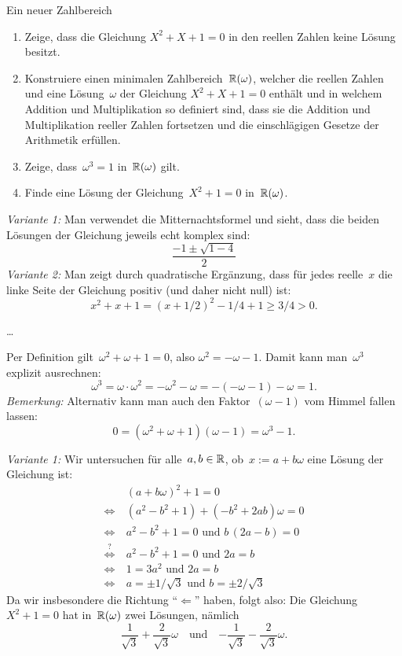 \documentclass{algblatt}
\begin{document}
\ifloesungen\newpage\fi
\begin{aufgabe}{Ein neuer Zahlbereich}
\begin{enumerate}
\item
Zeige, dass die Gleichung $X^2 + X + 1 = 0$ in den reellen Zahlen
keine Lösung besitzt.
\item
Konstruiere einen minimalen Zahlbereich~$\mathbb{R}(\omega)$, welcher die
reellen Zahlen und eine Lösung~$\omega$ der Gleichung $X^2 + X + 1 = 0$
enthält und in welchem Addition und Multiplikation so definiert sind, dass sie
die Addition und Multiplikation reeller Zahlen fortsetzen und die
einschlägigen Gesetze der Arithmetik erfüllen.
\item Zeige, dass~$\omega^3 = 1$ in~$\mathbb{R}(\omega)$ gilt.
\item Finde eine Lösung der Gleichung~$X^2 + 1 = 0$ in~$\mathbb{R}(\omega)$.
\end{enumerate}
\begin{loesungE}
\item \emph{Variante 1:} Man verwendet die Mitternachtsformel und sieht, dass
die beiden Lösungen der Gleichung jeweils echt komplex sind:
\[ \frac{-1 \pm \sqrt{1 - 4}}{2} \]
\emph{Variante 2:} Man zeigt durch quadratische Ergänzung, dass für jedes
reelle~$x$ die linke Seite der Gleichung positiv (und daher nicht null) ist:
\[ x^2 + x + 1 = (x + 1/2)^2 - 1/4 + 1 \geq 3/4 > 0. \]
\item \ldots
\item Per Definition gilt~$\omega^2 + \omega + 1 = 0$, also $\omega^2 = -\omega
- 1$. Damit kann man~$\omega^3$ explizit ausrechnen:
\[ \omega^3 = \omega \cdot \omega^2 = -\omega^2 - \omega = -(-\omega - 1) -
\omega = 1. \]
\emph{Bemerkung:} Alternativ kann man auch den Faktor~$(\omega-1)$ vom Himmel
fallen lassen:
\[ 0 = (\omega^2 + \omega + 1) (\omega - 1) = \omega^3 - 1. \]

\item \emph{Variante 1:} Wir untersuchen für alle~$a,b \in \mathbb{R}$, ob~$x := a + b
\omega$ eine Lösung der Gleichung ist:
\begin{align*}
  & (a + b\omega)^2 + 1 = 0 \\
  \Longleftrightarrow\ &
  (a^2 - b^2 + 1) + (-b^2 + 2ab) \omega = 0 \\
  \Longleftrightarrow\ &
  a^2 - b^2 + 1 = 0 \text{ und } b \, (2a-b) = 0 \\
  \stackrel{?}{\Longleftrightarrow}\ &
  a^2 - b^2 + 1 = 0 \text{ und } 2a = b \\
  \Longleftrightarrow\ &
  1 = 3 a^2 \text{ und } 2a = b \\
  \Longleftrightarrow\ &
  a = \pm 1 / \sqrt{3} \text{ und } b = \pm 2 / \sqrt{3}
\end{align*}
Da wir insbesondere die Richtung "`$\Leftarrow$"' haben, folgt also: Die
Gleichung~$X^2 + 1 = 0$ hat in~$\mathbb{R}(\omega)$ zwei Lösungen, nämlich
\[ \frac{1}{\sqrt{3}} + \frac{2}{\sqrt{3}} \omega \quad\text{und}\quad
  {-\frac{1}{\sqrt{3}} - \frac{2}{\sqrt{3}} \omega}. \]


\end{loesungE}
\end{aufgabe}
\end{document}
